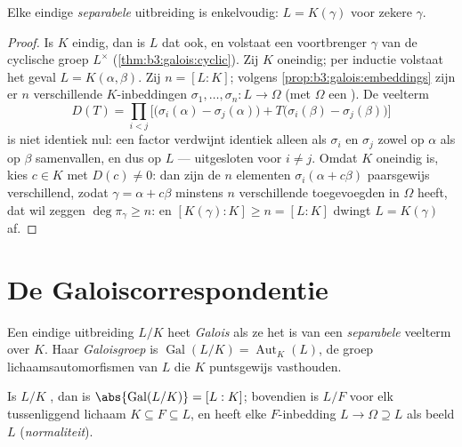 \begin{theorem}\label{thm:b3:galois:primitive}
Elke eindige \emph{separabele} uitbreiding is enkelvoudig: $L =
K(\gamma)$ voor zekere $\gamma$.
\end{theorem}

\begin{proof}
Is $K$ eindig, dan is $L$ dat ook, en volstaat een voortbrenger
$\gamma$ van de cyclische groep $L^\times$
(\cref{thm:b3:galois:cyclic}). Zij $K$ oneindig; per inductie
volstaat het geval $L = K(\alpha, \beta)$. Zij $n = [L:K]$;
volgens \cref{prop:b3:galois:embeddings} zijn er $n$
verschillende $K$-inbeddingen $\sigma_1, \dots, \sigma_n \colon L
\to \Omega$ (met $\Omega$ een ). De
veelterm
\[
D(T)=\prod_{i<j}\bigl[\bigl(\sigma_i(\alpha)-\sigma_j(\alpha)
\bigr) + T\bigl(\sigma_i(\beta) - \sigma_j(\beta)\bigr)\bigr]
\]
is niet identiek nul: een factor verdwijnt identiek alleen als
$\sigma_i$ en $\sigma_j$ zowel op $\alpha$ als op $\beta$
samenvallen, en dus op $L$ --- uitgesloten voor $i \neq j$. Omdat
$K$ oneindig is, kies $c \in K$ met $D(c) \ne 0$: dan zijn de $n$
elementen $\sigma_i(\alpha + c\beta)$ paarsgewijs verschillend,
zodat $\gamma = \alpha + c\beta$ minstens $n$ verschillende
toegevoegden in $\Omega$ heeft, dat wil zeggen $\deg \pi_\gamma
\geq n$: en $[K(\gamma):K] \geq n = [L:K]$ dwingt $L = K(\gamma)$
af.
\end{proof}

\section{De Galoiscorrespondentie}

\begin{definition}\label{def:b3:galois:galois}
Een eindige uitbreiding $L/K$ heet
\emph{Galois} als ze het
 is van een \emph{separabele} veelterm over $K$.
Haar \emph{Galoisgroep} is
$\operatorname{Gal}(L/K) = \operatorname{Aut}_K(L)$, de groep
lichaamsautomorfismen van $L$ die $K$ puntsgewijs vasthouden.
\end{definition}

\begin{proposition}\label{prop:b3:galois:galoisorder}
Is $L/K$ , dan is $\abs{\operatorname{Gal}(L/K)} = [L:K]$;
bovendien is $L/F$  voor elk tussenliggend lichaam $K
\subseteq F \subseteq L$, en heeft elke $F$-inbedding $L \to
\Omega \supseteq L$ als beeld $L$ (\emph{normaliteit}).
\end{proposition}

